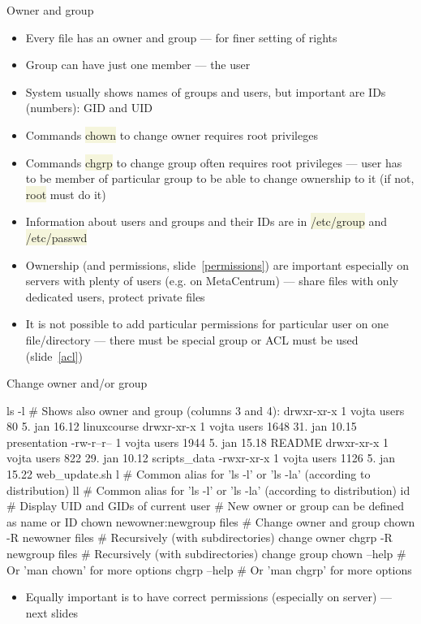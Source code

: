 \documentclass[compress, xelatex, 11pt, xcolor=svgnames, aspectratio=169, url={hyphens, lowtilde}]{beamer}
\renewcommand{\texttt}[1]{\colorbox{Beige}{{\ttfamily #1}}}
\begin{document}
\begin{frame}{Owner and group}
	\begin{itemize}
		\item Every file has an owner and group --- for finer setting of rights
		\item Group can have just one member --- the user
		\item System usually shows names of groups and users, but important are IDs (numbers): GID and UID
		\item Commands \texttt{chown} to change owner requires root privileges
		\item Commands \texttt{chgrp} to change group often requires root privileges --- user has to be member of particular group to be able to change ownership to it (if not, \texttt{root} must do it)
		\item Information about users and groups and their IDs are in \texttt{/etc/group} and \texttt{/etc/passwd}
		\item Ownership (and permissions, slide~\ref{permissions}) are important especially on servers with plenty of users (e.g. on MetaCentrum) --- share files with only dedicated users, protect private files
		\item It is not possible to add particular permissions for particular user on one file/directory --- there must be special group or ACL must be used (slide~\ref{acl})
	\end{itemize}
\end{frame}

\begin{frame}[fragile]{Change owner and/or group}
	\begin{bashcode}
    ls -l # Shows also owner and group (columns 3 and 4):
    drwxr-xr-x 1 vojta users    80  5. jan 16.12 linuxcourse
    drwxr-xr-x 1 vojta users  1648 31. jan 10.15 presentation
    -rw-r--r-- 1 vojta users  1944  5. jan 15.18 README
    drwxr-xr-x 1 vojta users   822 29. jan 10.12 scripts_data
    -rwxr-xr-x 1 vojta users  1126  5. jan 15.22 web_update.sh
    l # Common alias for 'ls -l' or 'ls -la' (according to distribution)
    ll # Common alias for 'ls -l' or 'ls -la' (according to distribution)
    id # Display UID and GIDs of current user
    # New owner or group can be defined as name or ID
    chown newowner:newgroup files # Change owner and group
    chown -R newowner files # Recursively (with subdirectories) change owner
    chgrp -R newgroup files # Recursively (with subdirectories) change group
    chown --help # Or 'man chown' for more options
    chgrp --help # Or 'man chgrp' for more options
	\end{bashcode}
	\begin{itemize}
		\item Equally important is to have correct permissions (especially on server) --- next slides
	\end{itemize}
\end{frame}
\end{document}
